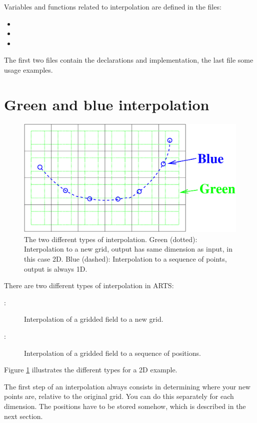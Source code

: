 Variables and functions related to interpolation are defined in the files:
\begin{itemize}
\item {}
\item {}
\item {}
\end{itemize}
The first two files contain the declarations and implementation, the
last file some usage examples.

\section{Green and blue interpolation}

\begin{figure}[htbp]
  \centering
  \includegraphics[width=.6\hsize]{interpolation_types}
  \caption{The two different types of interpolation. Green (dotted):
    Interpolation to a new grid, output has same dimension as input,
    in this case 2D. Blue (dashed): Interpolation to a sequence of
    points, output is always 1D.}
  \label{fig:interpolation:types}
\end{figure}

There are two different types of interpolation in ARTS:
\begin{description}
\item[:] Interpolation of a gridded field to a new
  grid.
\item[:] Interpolation of a gridded field to a
  sequence of positions.
\end{description}
Figure \ref{fig:interpolation:types} illustrates the different types
for a 2D example. 

The first step of an interpolation always consists in determining
where your new points are, relative to the original grid. You can do
this separately for each dimension. The positions have to be stored
somehow, which is described in the next section.

